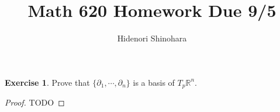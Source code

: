 \documentclass[12pt, psamsfonts]{amsart}
\theoremstyle{definition}
\newtheorem{exer}[thm]{Exercise}
\theoremstyle{remark}
\numberwithin{equation}{section}
\begin{document}
\title{Math 620 Homework Due 9/5}
\author{Hidenori Shinohara}
\maketitle

\begin{exer}
  Prove that $\{ \partial_1, \cdots, \partial_n \}$ is a basis of $T_p \mathbb{R}^n$.
\end{exer}

\begin{proof}
  TODO
\end{proof}
\end{document}
